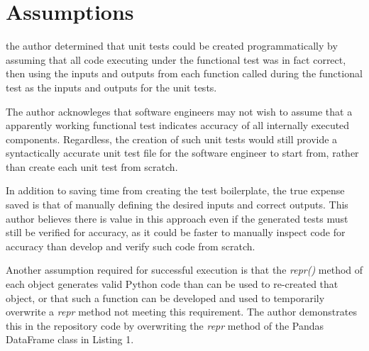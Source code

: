 \section{Assumptions}\label{sec:introduction}

the author determined that unit tests could be
created programmatically by assuming that all code executing under the
functional test was in fact correct, then using the inputs and outputs from each
function called during the functional test as the inputs and outputs for the
unit tests.  

The author acknowleges that software engineers may not 
wish to assume that a apparently working functional test indicates accuracy of 
all internally executed components. Regardless, the creation of such unit 
tests would still provide a syntactically accurate unit
test file for the software engineer to start from, rather than create each unit
test from scratch.  

In addition to saving time from creating the test
boilerplate, the true expense saved is that of manually defining the desired
inputs and correct outputs.  This author believes there is value in this
approach even if the generated tests must still be verified for accuracy, as it
could be faster to manually inspect code for accuracy than develop and verify
such code from scratch.

Another assumption required for successful execution is that the \textit{repr()} method
of each object generates valid Python code than can be used to re-created that
object, or that such a function can be developed and used to temporarily
overwrite a \textit{repr\(\)} method not meeting this requirement.  The author demonstrates
this in the repository code by overwriting the \textit{repr\(\)} method of the
Pandas DataFrame class in Listing 1.

 
 

